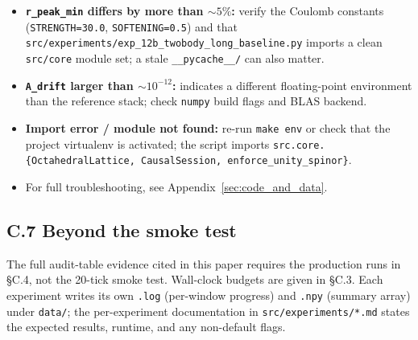\begin{itemize}\setlength{\itemsep}{0.2em}
\item \textbf{\texttt{r\_peak\_min} differs by more than $\sim 5\%$:}
verify the Coulomb constants (\texttt{STRENGTH=30.0},
\texttt{SOFTENING=0.5}) and that
\texttt{src/experiments/exp\_12b\_twobody\_long\_baseline.py}
imports a clean \texttt{src/core} module set; a stale
\texttt{\_\_pycache\_\_/} can also matter.
\item \textbf{\texttt{A\_drift} larger than $\sim 10^{-12}$:}
indicates a different floating-point environment than the reference
stack; check \texttt{numpy} build flags and BLAS backend.
\item \textbf{Import error / module not found:} re-run \texttt{make
env} or check that the project virtualenv is activated; the script
imports \texttt{src.core.\{OctahedralLattice, CausalSession,
enforce\_unity\_spinor\}}.
\item For full troubleshooting, see Appendix~\ref{sec:code_and_data}.
\end{itemize}

\subsection*{C.7 Beyond the smoke test}

The full audit-table evidence cited in this paper requires the
production runs in §C.4, not the 20-tick smoke test.  Wall-clock
budgets are given in §C.3.  Each experiment writes its own
\texttt{.log} (per-window progress) and \texttt{.npy} (summary array)
under \texttt{data/}; the per-experiment documentation in
\texttt{src/experiments/*.md} states the expected results, runtime,
and any non-default flags.
